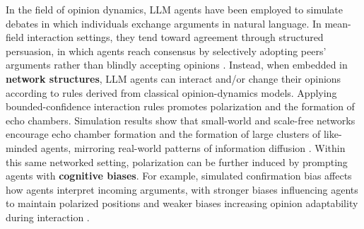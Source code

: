 \documentclass[11pt]{article}
\begin{document}
In the field of opinion dynamics, LLM agents have been employed to simulate debates in which individuals exchange arguments in natural language. 
In mean-field interaction settings, they tend toward agreement through structured persuasion, in which agents reach consensus by selectively adopting peers’ arguments rather than blindly accepting opinions \cite{cau2025selective}.
Instead, when embedded in \textbf{network structures}, LLM agents can interact and/or change their opinions according to rules derived from classical opinion-dynamics models.  
Applying bounded-confidence interaction rules promotes polarization and the formation of echo chambers. 
Simulation results show that small-world and scale-free networks encourage echo chamber formation and the formation of large clusters of like-minded agents, mirroring real-world patterns of information diffusion \cite{wang2025decoding}.
Within this same networked setting, polarization can be further induced by prompting agents with \textbf{cognitive biases}.
For example, simulated confirmation bias affects how agents interpret incoming arguments, with stronger biases influencing agents to maintain polarized positions and weaker biases increasing opinion adaptability during interaction \cite{chuang2024simulating}.
\end{document}
